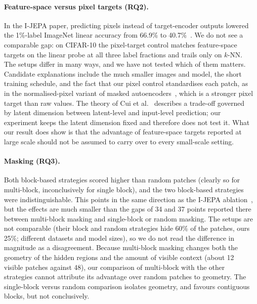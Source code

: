 \documentclass[pdflatex,sn-basic]{sn-jnl}%
\begin{document}
\paragraph{Feature-space versus pixel targets (RQ2).}
In the I-JEPA paper, predicting pixels instead of target-encoder outputs lowered the 1\%-label ImageNet linear accuracy from 66.9\% to 40.7\%~\cite{assran2023ijepa}. We do not see a comparable gap: on CIFAR-10 the pixel-target control matches feature-space targets on the linear probe at all three label fractions and trails only on $k$-NN. The setups differ in many ways, and we have not tested which of them matters. Candidate explanations include the much smaller images and model, the short training schedule, and the fact that our pixel control standardises each patch, as in the normalised-pixel variant of masked autoencoders~\cite{he2022mae}, which is a stronger pixel target than raw values. The theory of Cui et al.~\cite{cui2026theory} describes a trade-off governed by latent dimension between latent-level and input-level prediction; our experiment keeps the latent dimension fixed and therefore does not test it. What our result does show is that the advantage of feature-space targets reported at large scale should not be assumed to carry over to every small-scale setting.

\paragraph{Masking (RQ3).}
Both block-based strategies scored higher than random patches (clearly so for multi-block, inconclusively for single block), and the two block-based strategies were indistinguishable. This points in the same direction as the I-JEPA ablation~\cite{assran2023ijepa}, but the effects are much smaller than the gaps of 34 and 37 points reported there between multi-block masking and single-block or random masking. The setups are not comparable (their block and random strategies hide 60\% of the patches, ours 25\%; different datasets and model sizes), so we do not read the difference in magnitude as a disagreement. Because multi-block masking changes both the geometry of the hidden regions and the amount of visible context (about 12 visible patches against 48), our comparison of multi-block with the other strategies cannot attribute its advantage over random patches to geometry. The single-block versus random comparison isolates geometry, and favours contiguous blocks, but not conclusively.
\end{document}
